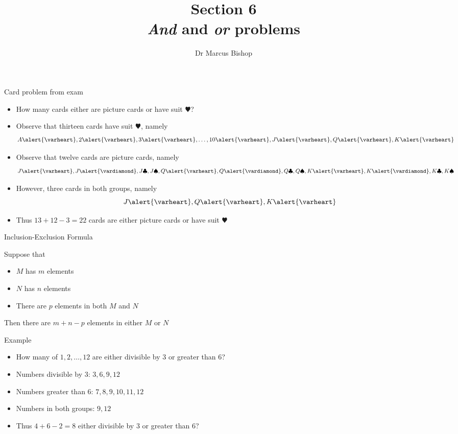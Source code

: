 \documentclass{beamer}
\title[\S6]{Section 6\\{\em And} and {\em or} problems}
\author{Dr Marcus Bishop}
\theoremstyle{definition}
\begin{document}
\begin{frame}\titlepage\end{frame}
\LogoOff

\begin{frame}{Card problem from exam}
\begin{itemize}
\item How many cards either are picture cards or have
suit \alert{$\varheart$}?
\item Observe that thirteen cards have
suit \alert{$\varheart$}, namely
\[A\alert{\varheart},
2\alert{\varheart},
3\alert{\varheart},\ldots,
10\alert{\varheart},
J\alert{\varheart},
Q\alert{\varheart},
K\alert{\varheart}\]
\item Observe that twelve cards are picture cards, namely
\[J\alert{\varheart},J\alert{\vardiamond},J\clubsuit,J\spadesuit,
Q\alert{\varheart},Q\alert{\vardiamond},Q\clubsuit,Q\spadesuit,
K\alert{\varheart},K\alert{\vardiamond},K\clubsuit,K\spadesuit\]
\item However, \alert{three} cards in both groups,
namely
\[J\alert{\varheart},Q\alert{\varheart},K\alert{\varheart}\]
\item Thus $13+12-3=22$ cards are either picture cards or have 
suit \alert{$\varheart$}
\end{itemize}
\end{frame}

\begin{frame}{Inclusion-Exclusion Formula}
\begin{theorem}
Suppose that
\begin{itemize}
\item $M$ has $m$ elements 
\item $N$ has $n$ elements
\item There are $p$ elements in \alert{both} $M$ and $N$
\end{itemize}
Then there are $m+n-p$ elements in \alert{either} $M$ or $N$
\end{theorem}
\end{frame}

\begin{frame}{Example}
\begin{itemize}
\item How many of $1,2,\ldots,12$ are
either divisible by $3$ or greater than $6$?
\item Numbers divisible by $3$: $3,6,9,12$
\item Numbers greater than $6$: $7,8,9,10,11,12$
\item Numbers in both groups: $9,12$
\item Thus $4+6-2=8$
either divisible by $3$ or greater than $6$?
\end{itemize}
\end{frame}
\end{document}
